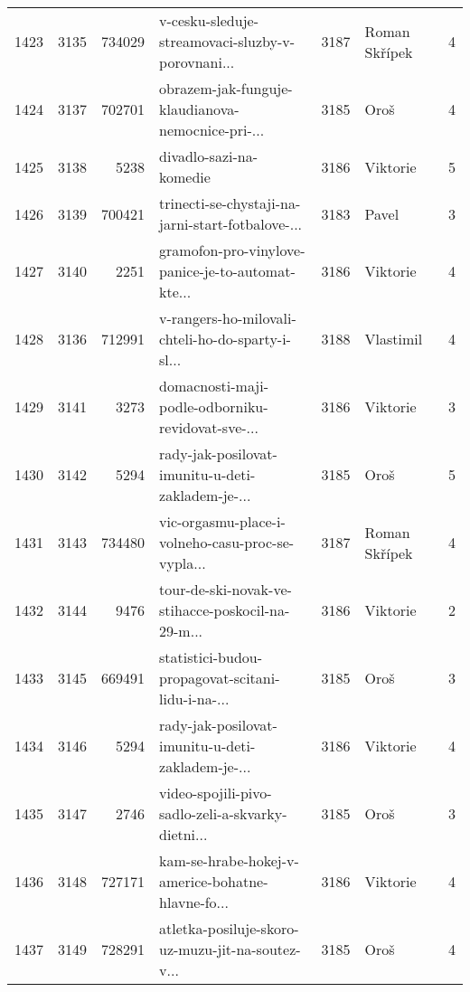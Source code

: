 \begin{tabular}{lrrlrlr}
1423 &       3135 &   734029 &  v-cesku-sleduje-streamovaci-sluzby-v-porovnani... &     3187 &                Roman Skřípek &               4 \\
1424 &       3137 &   702701 &  obrazem-jak-funguje-klaudianova-nemocnice-pri-... &     3185 &                         Oroš &               4 \\
1425 &       3138 &     5238 &                            divadlo-sazi-na-komedie &     3186 &                     Viktorie &               5 \\
1426 &       3139 &   700421 &  trinecti-se-chystaji-na-jarni-start-fotbalove-... &     3183 &                        Pavel &               3 \\
1427 &       3140 &     2251 &  gramofon-pro-vinylove-panice-je-to-automat-kte... &     3186 &                     Viktorie &               4 \\
1428 &       3136 &   712991 &  v-rangers-ho-milovali-chteli-ho-do-sparty-i-sl... &     3188 &                    Vlastimil &               4 \\
1429 &       3141 &     3273 &  domacnosti-maji-podle-odborniku-revidovat-sve-... &     3186 &                     Viktorie &               3 \\
1430 &       3142 &     5294 &  rady-jak-posilovat-imunitu-u-deti-zakladem-je-... &     3185 &                         Oroš &               5 \\
1431 &       3143 &   734480 &  vic-orgasmu-place-i-volneho-casu-proc-se-vypla... &     3187 &                Roman Skřípek &               4 \\
1432 &       3144 &     9476 &  tour-de-ski-novak-ve-stihacce-poskocil-na-29-m... &     3186 &                     Viktorie &               2 \\
1433 &       3145 &   669491 &  statistici-budou-propagovat-scitani-lidu-i-na-... &     3185 &                         Oroš &               3 \\
1434 &       3146 &     5294 &  rady-jak-posilovat-imunitu-u-deti-zakladem-je-... &     3186 &                     Viktorie &               4 \\
1435 &       3147 &     2746 &  video-spojili-pivo-sadlo-zeli-a-skvarky-dietni... &     3185 &                         Oroš &               3 \\
1436 &       3148 &   727171 &  kam-se-hrabe-hokej-v-americe-bohatne-hlavne-fo... &     3186 &                     Viktorie &               4 \\
1437 &       3149 &   728291 &  atletka-posiluje-skoro-uz-muzu-jit-na-soutez-v... &     3185 &                         Oroš &               4 \\

\end{tabular}
